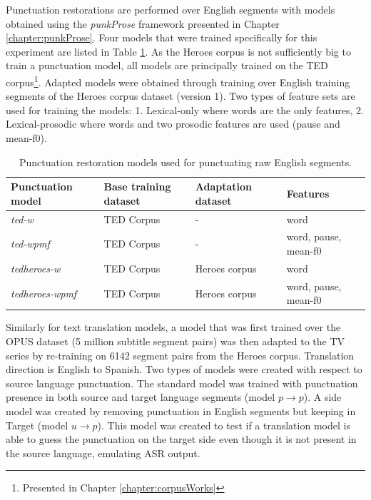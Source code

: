 Punctuation restorations are performed over English segments with models obtained using the \textit{punkProse} framework presented in Chapter \ref{chapter:punkProse}. Four models that were trained specifically for this experiment are listed in Table \ref{table:punkModels}. As the Heroes corpus is not sufficiently big to train a punctuation model, all models are principally trained on the TED corpus\footnote{Presented in Chapter \ref{chapter:corpusWorks}}. Adapted models were obtained through training over English training segments of the Heroes corpus dataset (version 1). Two types of feature sets are used for training the models: 1. Lexical-only where words are the only features, 2. Lexical-prosodic where words and two prosodic features are used (pause and mean-f0).

\begin{table}[!tbp]
\begin{tabular}{p{2.9cm}|p{2.7cm}|p{2.5cm}|p{3.65cm}}
\toprule
\textbf{Punctuation model} & \textbf{Base training dataset} & \textbf{Adaptation dataset} & \textbf{Features}\\
\midrule
\textit{ted-w}          & TED Corpus   & -               & word \\
\textit{ted-wpmf }      & TED Corpus   & -               & word, pause, mean-f0 \\
\textit{tedheroes-w}    & TED Corpus   & Heroes corpus   & word \\
\textit{tedheroes-wpmf} & TED Corpus   & Heroes corpus   & word, pause, mean-f0 \\
\bottomrule
\end{tabular}
\caption{Punctuation restoration models used for punctuating raw English segments.}
\label{table:punkModels}
\end{table}

Similarly for text translation models, a model that was first trained over the OPUS dataset (5 million subtitle segment pairs) was then adapted to the TV series by re-training on 6142 segment pairs from the Heroes corpus. Translation direction is English to Spanish. Two types of models were created with respect to source language punctuation. The standard model was trained with punctuation presence in both source and target language segments (model $ p \rightarrow p $). A side model was created by removing punctuation in English segments but keeping in Target (model $ u \rightarrow p $). This model was created to test if a translation model is able to guess the punctuation on the target side even though it is not present in the source language, emulating ASR output.


